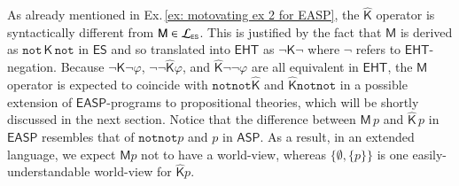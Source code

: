 \documentclass[submission,copyright,creativecommons]{eptcs}
\renewcommand{\phi}  { \varphi }
\newcommand{\lang}[1]  { {\cal L}_{#1} }
\newcommand{\set}[1]  { \{ #1 \} }
\newcommand{\logic}[1]  { \ensuremath{\mathsf{#1}} }
\newcommand{\EHT}  { \logic{EHT} }
\newcommand{\ASP}  { \logic{ASP} }
\newcommand{\ES}  { \logic{ES} }
\newcommand{\EASP}  { \logic{EASP} }
\newcommand{\lpnot}  { \mathtt{not} \, }
\newcommand{\notlp}  { \mathtt{not} }
\newcommand{\intnot}  { \neg }
\newcommand{\K}  { \mathsf{K} }
\newcommand{\M}  { \mathsf{M} }
\newcommand{\Khat}  { \hat{\mathsf{K}} }
\begin{document}
As already mentioned in Ex.\,\ref{ex: motovating ex 2 for EASP}, the $\Khat$ operator 
is syntactically different from $\M \in \lang{\scriptscriptstyle{\ES}}$. This is
justified by the fact that $\M$ is derived as $\lpnot \K\, \notlp$ in $\ES$ and so
translated into $\EHT$ as $\intnot \K \intnot$ where $\intnot$ refers to $\EHT$-negation. 
Because $\intnot \K \intnot \phi$, $\intnot \intnot \Khat \phi$, and
$\Khat \intnot \intnot \phi$ are
all equivalent in $\EHT$, the $\M$ operator is expected to coincide with
$\notlp \notlp \Khat$ and $\Khat \notlp \notlp$ in a possible extension of 
$\EASP$-programs
to propositional theories, which will be shortly discussed in the next section.
Notice that the difference between $\M\, p$ and $\Khat\, p$ in $\EASP$ resembles
that of $\notlp \notlp p$ and $p$ in $\ASP$. As a result,  in an extended language,
we expect $\M p$ not to have a world-view,
whereas $\set{\emptyset, \set p}$ is one easily-understandable 
world-view for $\Khat p$.
\end{document}
